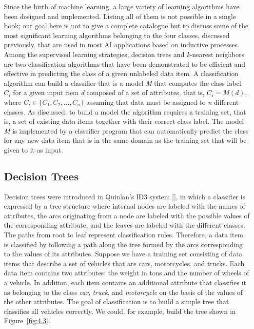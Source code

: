 \noindent Since the birth of machine learning, a large variety of learning algorithms have been designed and implemented. Listing all of them is not possible in a single book; our goal here is not to give a complete catalogue but to discuss some of the most significant learning algorithms belonging to the four classes, discussed previously, that are used in most AI applications based on inductive processes. Among the supervised learning strategies, decision trees and \textit{k}-nearest neighbors are two classification algorithms that have been demonstrated to be efficient and effective in predicting the class of a given unlabeled data item. A classification algorithm can build a classifier that is a model \textit{M} that computes the class label $C_{i}$ for a given input item \textit{d} composed of a set of attributes, that is, $C{}_{i} = M(d)$, where $C{}_{i} \in \{C{}_{1}, C{}_{2}, \ldots , C{}_{n}\}$ assuming that data must be assigned to \textit{n} different classes. As discussed, to build a model the algorithm requires a training set, that is, a set of existing data items together with their correct class label. The model \textit{M} is implemented by a classifier program that can automatically predict the class for any new data item that is in the same domain as the training set that will be given to it as input.

\subsection{\label{sec:4.4.1}Decision Trees}

\noindent Decision
trees were introduced in Quinlan's ID3 system [\citealt{chap:4:Quinlan:1986}], in which a classifier is expressed by a tree structure where internal nodes are labeled with the names of attributes, the arcs originating from a node are labeled with the possible values of the corresponding attribute, and the leaves are labeled with the different classes. The paths from root to leaf represent classification rules. Therefore, a data item is classified by following a path along the tree formed by the arcs corresponding to the values of its attributes. Suppose we have a training set consisting of data items that describe a set of vehicles that are cars, motorcycles, and trucks. Each data item contains two attributes: the weight in tons and the number of wheels of a vehicle. In addition, each item contains an additional attribute that classifies it as belonging to the class \textit{car}, \textit{truck}, and \textit{motorcycle} on the basis of the values of the other attributes. The goal of classification is to build a simple tree that classifies all vehicles correctly. We could, for example, build the tree shown in Figure~\ref{fig:4.3}.

